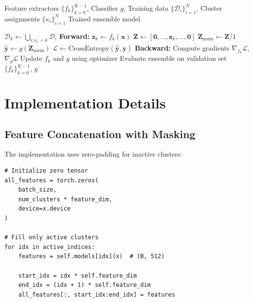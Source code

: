 \documentclass[11pt,a4paper]{article}
\begin{document}
\begin{algorithm}
\caption{Hierarchical Training (Pooled)}
\begin{algorithmic}[1]
\Require Feature extractors $\{f_k\}_{k=0}^{K-1}$, Classifier $g$, Training data $\{\mathcal{D}_i\}_{i=1}^N$, Cluster assignments $\{\kappa_i\}_{i=1}^N$
\Ensure Trained ensemble model

 
     
        \State $\mathcal{D}_k \gets \bigcup_{i: \kappa_i = k} \mathcal{D}_i$ 
                \State \textbf{Forward:}
                \State $\mathbf{z}_k \gets f_k(\mathbf{x})$
                \State $\mathbf{Z} \gets [\mathbf{0}, \ldots, \mathbf{z}_k, \ldots, \mathbf{0}]$ 
                \State $\mathbf{Z}_{\text{norm}} \gets \mathbf{Z} / 1$ 
                \State $\hat{\mathbf{y}} \gets g(\mathbf{Z}_{\text{norm}})$
                \State $\mathcal{L} \gets \text{CrossEntropy}(\hat{\mathbf{y}}, \mathbf{y})$
                \State \textbf{Backward:}
                \State Compute gradients $\nabla_{f_k} \mathcal{L}$, $\nabla_g \mathcal{L}$
                \State Update $f_k$ and $g$ using optimizer
            \EndFor
        \EndFor
    \EndFor
    \State Evaluate ensemble on validation set
\EndFor
\State \Return $\{f_k\}_{k=0}^{K-1}$, $g$
\end{algorithmic}
\end{algorithm}

\section{Implementation Details}

\subsection{Feature Concatenation with Masking}

The implementation uses zero-padding for inactive clusters:

\begin{lstlisting}[caption={Feature Masking Implementation}]
# Initialize zero tensor
all_features = torch.zeros(
    batch_size, 
    num_clusters * feature_dim, 
    device=x.device
)

# Fill only active clusters
for idx in active_indices:
    features = self.models[idx](x)  # (B, 512)
    
    start_idx = idx * self.feature_dim
    end_idx = (idx + 1) * self.feature_dim
    all_features[:, start_idx:end_idx] = features
\end{lstlisting}
\end{document}
